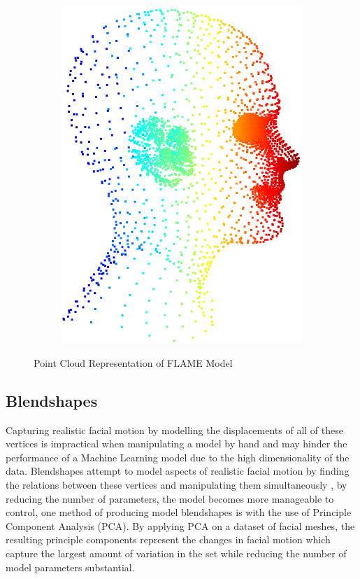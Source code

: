 \documentclass[12pt]{report}
\begin{document}
\begin{figure}[h]
\begin{subfigure}[b]{0.28\textwidth}
        \includegraphics[width=\textwidth]{figures/flame_side.png}
    \end{subfigure}
    \caption{Point Cloud Representation of FLAME Model \cite{Li2017}}\label{fig:FLAME_Point_Cloud}
\end{figure}

\subsection{Blendshapes}
Capturing realistic facial motion by modelling the displacements of all of these vertices is impractical when manipulating a model by hand and may hinder the performance of a Machine Learning model due to the high dimensionality of the data.
Blendshapes attempt to model aspects of realistic facial motion by finding the relations between these vertices and manipulating them simultaneously \cite{Lewis2010}, by reducing the number of parameters, the model becomes more manageable to control, one method of producing model blendshapes is with the use of Principle Component Analysis (PCA).
By applying PCA on a dataset of facial meshes, the resulting principle components represent the changes in facial motion which capture the largest amount of variation in the set while reducing the number of model parameters substantial.
\end{document}
